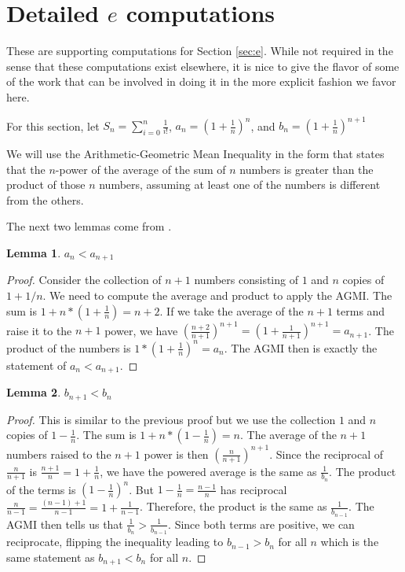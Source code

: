 \documentclass[12pt]{article}
\newtheorem{lemma}{Lemma}
\theoremstyle{remark}
\begin{document}
\section{Detailed $e$ computations}\label{app:e}

These are supporting computations for Section \ref{sec:e}. While not required in the sense that these computations exist elsewhere, it is nice to give the flavor of some of the work that can be involved in doing it in the more explicit fashion we favor here. 

For this section, let $S_n = \sum_{i=0}^n \frac{1}{i!}$, $a_n = (1+\frac{1}{n})^{n}  $, and $b_n = (1+\frac{1}{n})^{n+1}$

We will use the Arithmetic-Geometric Mean Inequality in the form that states that the $n$-power of the average of the sum of $n$ numbers is greater than the product of those $n$ numbers, assuming at least one of the numbers is different from the others. 

The next two lemmas come from \cite{mend}.

\begin{lemma}
  $ a_n < a_{n+1}$ 
\end{lemma}

\begin{proof}
Consider the collection of $n+1$ numbers consisting of $1$ and $n$ copies of $1+1/n$. We need to compute the average and product to apply the AGMI. The sum is $1 + n* (1 + \frac{1}{n} ) = n+2$. If we take the average of the $n+1$ terms and raise it to the $n+1$ power, we have $(\frac{n+2}{n+1})^{n+1} = (1 + \frac{1}{n+1})^{n+1} = a_{n+1}$. The product of the numbers is $1*(1+\frac{1}{n})^n = a_n$. The AGMI then is exactly the statement of $a_n < a_{n+1}$.
\end{proof}

\begin{lemma}
 $b_{n+1} < b_n$
\end{lemma}

\begin{proof}
This is similar to the previous proof but we use the collection $1$ and $n$ copies of $1 - \frac{1}{n}$. The sum is $1 + n*(1-\frac{1}{n}) = n$. The average of the $n+1$ numbers raised to the $n+1$ power is then $(\frac{n}{n+1})^{n+1}$. Since the reciprocal of $\frac{n}{n+1}$ is $\frac{n+1}{n} = 1+\frac{1}{n}$, we have the powered average is the same as $\frac{1}{b_n}$. The product of the terms is $(1-\frac{1}{n})^n$. But $1 - \frac{1}{n} = \frac{n-1}{n}$ has reciprocal $\frac{n}{n-1} = \frac{ (n-1) + 1}{n-1} = 1 + \frac{1}{n-1}$. Therefore, the product is the same as $\frac{1}{b_{n-1}}$. The AGMI then tells us that $\frac{1}{b_n} > \frac{1}{b_{n-1}}$. Since both terms are positive, we can reciprocate, flipping the inequality leading to $b_{n-1} > b_n$ for all $n$ which is the same statement as $b_{n+1} < b_n$ for all $n$. 
\end{proof}
\end{document}
